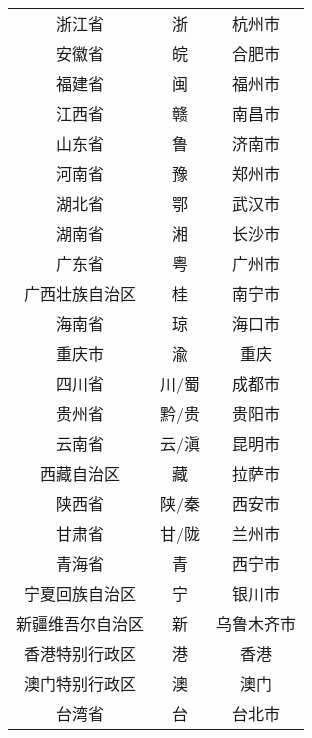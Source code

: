 \begin{longtable}{ccc}
	浙江省                & 浙   & 杭州市                    \\
	安徽省                & 皖   & 合肥市                    \\
	福建省                & 闽   & 福州市                    \\
	江西省                & 赣   & 南昌市                    \\
	山东省                & 鲁   & 济南市                    \\
	河南省                & 豫   & 郑州市                    \\
	湖北省                & 鄂   & 武汉市                    \\
	湖南省                & 湘   & 长沙市                    \\
	广东省                & 粤   & 广州市                    \\
	广西壮族自治区            & 桂   & 南宁市                    \\
	海南省                & 琼   & 海口市                    \\
	重庆市                & 渝   & 重庆                     \\
	四川省                & 川/蜀 & 成都市                    \\
	贵州省                & 黔/贵 & 贵阳市                    \\
	云南省                & 云/滇 & 昆明市                    \\
	西藏自治区              & 藏   & 拉萨市                    \\
	陕西省                & 陕/秦 & 西安市                    \\
	甘肃省                & 甘/陇 & 兰州市                    \\
	青海省                & 青   & 西宁市                    \\
	宁夏回族自治区            & 宁   & 银川市                    \\
	新疆维吾尔自治区           & 新   & 乌鲁木齐市                  \\
	香港特别行政区            & 港   & 香港                     \\
	澳门特别行政区            & 澳   & 澳门                     \\
	台湾省                & 台   & 台北市                    \\
\end{longtable}\normalsize
\vspace{-1em}

